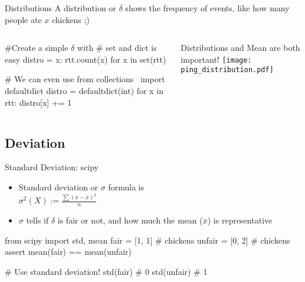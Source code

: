 \iffalse %
def ping_rtt():
    """
       goal: slicing data
       goal: using zip to transpose data
    """
    cmd = "ping -c10 www.google.it"
    if 'win' in sys.platform:
        cmd = "ping -n10 www.google.it"

    ping_output = sh(cmd)
    if 'win' in sys.platform:
        ping_output = [ping_output[6::2] for x in ping_output]
    else:
        ping_output = [ping_output[-4:-1:2] for x in ping_output]
    ttl, rtt = zip(*ping_output)
    return map(float, rtt)
\fi


\begin{frame}[fragile]{Distributions}
A distribution or $\delta$ shows the frequency of events, like 
how many people ate $x$ chickens ;)
\begin{columns}
\column[t]{5cm}
\begin{pythoncode}
#Create a simple $\delta$ with
#    set and dict is easy
distro = {x: rtt.count(x) 
  for x in set(rtt)}
  
# We can even use
from collections \
  import defaultdict
distro = defaultdict(int)
for x in rtt:
    distro[x] += 1
    

\end{pythoncode}
\column[t]{5cm}
Distributions and Mean are both important!
\texttt{[image: ping\_distribution.pdf]}  
\end{columns}
\end{frame}

\subsection{Deviation}
\begin{frame}[fragile]{Standard Deviation: scipy}
\begin{itemize}
\item Standard deviation or $\sigma$ formula is 
 \\
 $\sigma^{2}(X) := \frac{ \sum(x-\bar{x})^{2} }{n} $
\item $\sigma$ tells if $\delta$ is fair or not, and how much the mean ($\bar{x}$) is representative
\end{itemize}
\begin{pythoncode}
from scipy import std, mean
fair = [1, 1] # chickens
unfair = [0, 2] # chickens
assert mean(fair) == mean(unfair)

# Use standard deviation!
std(fair) # 0
std(unfair) # 1
\end{pythoncode}
\end{frame}


